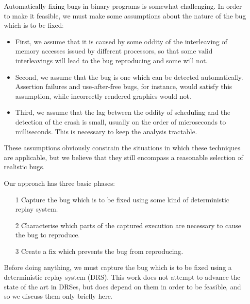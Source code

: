 \documentclass[10pt,a4paper]{report}
\begin{document}
Automatically fixing bugs in binary programs is somewhat challenging.
In order to make it feasible, we must make some assumptions about the
nature of the bug which is to be fixed:

\begin{itemize}
\item First, we assume that it is caused by some oddity of the
  interleaving of memory accesses issued by different processors, so
  that some valid interleavings will lead to the bug reproducing and
  some will not.

\item Second, we assume that the bug is one which can be detected
  automatically.  Assertion failures and use-after-free bugs, for
  instance, would satisfy this assumption, while incorrectly rendered
  graphics would not.

\item Third, we assume that the lag between the oddity of scheduling
  and the detection of the crash is small, usually on the order of
  microseconds to milliseconds.  This is necessary to keep the
  analysis tractable.
\end{itemize}

These assumptions obviously constrain the situations in which these
techniques are applicable, but we believe that they still encompass a
reasonable selection of realistic bugs.

Our approach has three basic phases:

\begin{itemize}
\item[1] Capture the bug which is to be fixed using some kind of
  deterministic replay system.
\item[2] Characterise which parts of the captured execution are
  necessary to cause the bug to reproduce.
\item[3] Create a fix which prevents the bug from reproducing.
\end{itemize}

Before doing anything, we must capture the bug which is to be fixed
using a deterministic replay system (DRS).  This work does not attempt
to advance the state of the art in DRSes, but does depend on them in
order to be feasible, and so we discuss them only briefly here.
\end{document}
